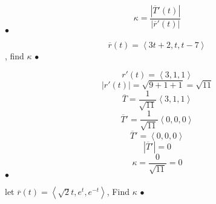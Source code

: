 	\begin{definition}[Curvature]
		\[\kappa = \frac{\left| \overline{T}'(t) \right| }{\left| \overline{r}'(t) \right| }\]
	\smallskip\hfill$\bullet$\end{definition}

	\begin{example}[Curvature]
		\[\overline{r}(t) = \left<3t+2, t, t-7 \right>\] , find $\kappa$
	\smallskip\hfill$\bullet$\end{example}

	\begin{solution}[Curvature]
		\[ r'(t) = \left<3, 1, 1 \right>\]
		\[\left| r'(t) \right|= \sqrt{9 + 1 + 1}   = \sqrt{11} \]
		\[\overline{T} = \frac{1}{\sqrt{11} } \left<3, 1, 1 \right>\]
		\[\overline{T}' = \frac{1}{\sqrt{11} } \left<0, 0, 0 \right>\]
		\[\overline{T}' =\left<0, 0, 0 \right>\]
		\[\left|  \overline{T}' \right| =0\]
		\[\kappa = \frac{0}{\sqrt{11} } = 0\]
	\smallskip\hfill$\bullet$\end{solution}

	\begin{example}[Curvature]
		let $\overline{r}(t) = \left< \sqrt{2} t, e^{t}, e^{-t} \right>$, Find $\kappa$
	\smallskip\hfill$\bullet$\end{example}

